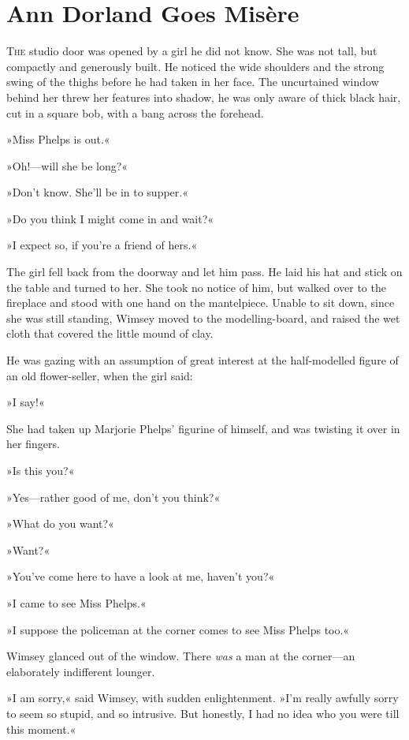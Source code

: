 \chapter{Ann Dorland Goes Misère}

\lettrine[lines=4]{T}{he} studio door was opened by a girl he did not know. She was not tall, but compactly and generously built. He noticed the wide shoulders and the strong swing of the thighs before he had taken in her face. The uncurtained window behind her threw her features into shadow, he was only aware of thick black hair, cut in a square bob, with a bang across the forehead.

»Miss Phelps is out.«

»Oh!—will she be long?«

»Don't know. She'll be in to supper.«

»Do you think I might come in and wait?«

»I expect so, if you're a friend of hers.«

The girl fell back from the doorway and let him pass. He laid his hat and stick on the table and turned to her. She took no notice of him, but walked over to the fireplace and stood with one hand on the mantelpiece. Unable to sit down, since she was still standing, Wimsey moved to the modelling-board, and raised the wet cloth that covered the little mound of clay.

He was gazing with an assumption of great interest at the half-modelled figure of an old flower-seller, when the girl said:

»I say!«

She had taken up Marjorie Phelps' figurine of himself, and was twisting it over in her fingers.

»Is this you?«

»Yes—rather good of me, don't you think?«

»What do you want?«

»Want?«

»You've come here to have a look at me, haven't you?«

»I came to see Miss Phelps.«

»I suppose the policeman at the corner comes to see Miss Phelps too.«

Wimsey glanced out of the window. There \textit{was} a man at the corner—an elaborately indifferent lounger.

»I am sorry,« said Wimsey, with sudden enlightenment. »I'm really awfully sorry to seem so stupid, and so intrusive. But honestly, I had no idea who you were till this moment.«

